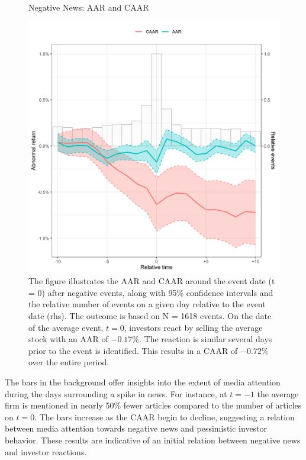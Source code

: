 \begin{figure} [H]
    \centering
    \caption{Negative News: AAR and CAAR}
    \includegraphics[scale=0.6]{Projekt/1.Figures analysis/ST_negative_all_CI.png}
     \caption*{\footnotesize The figure illustrates the AAR and CAAR around the event date (t = 0) after negative events, along with 95\% confidence intervals and the relative number of events on a given day relative to the event date (rhs). The outcome is based on N = 1618 events. On the date of the average event, $t=0$, investors react by selling the average stock with an AAR of $-0.17\%$. The reaction is similar several days prior to the event is identified. This results in a CAAR of $-0.72\%$ over the entire period.  
      }
    \label{fig:ST_neg_news}
\end{figure} 
 
The bars in the background offer insights into the extent of media attention during the days surrounding a spike in news. For instance, at $t = -1$ the average firm is mentioned in nearly 50\% fewer articles compared to the number of articles on $t = 0$. The bars increase as the CAAR begin to decline, suggesting a relation between media attention towards negative news and pessimistic investor behavior. These results are indicative of an initial relation between negative news and investor reactions. 

